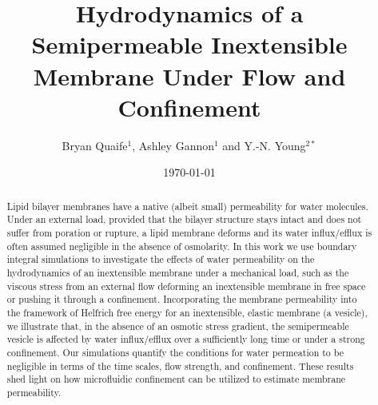 \documentclass[prb,preprint,showpacs,preprintnumbers,amsmath,amssymb,longbibliography]{revtex4-1}
\begin{document}
\title{Hydrodynamics of a Semipermeable Inextensible Membrane Under Flow
and Confinement}

\author{Bryan Quaife$^{1}$, Ashley Gannon$^{1}$ and Y.-N. Young$^{2*}$}

\date{\today}


\begin{abstract}
Lipid bilayer membranes have a native (albeit small) permeability for
water molecules. Under an external load, 
provided that the bilayer structure stays intact and does
not suffer from poration or rupture,
a lipid membrane deforms and
its water influx/efflux is often assumed negligible in the absence of
osmolarity. 
%
In this work we use boundary integral simulations to investigate the
effects of water permeability on the hydrodynamics of an inextensible membrane under
a mechanical load, such as the viscous stress from an external flow
deforming an inextensible membrane in free space or pushing it through a
confinement. Incorporating the membrane permeability into the framework of Helfrich free energy for an inextensible, elastic membrane (a vesicle), we
illustrate that, in the absence of an osmotic stress gradient, the
semipermeable vesicle is affected by water influx/efflux over a
sufficiently long time or under a strong confinement. Our simulations
quantify the conditions for water permeation to be negligible in terms
of the time scales, flow strength, and confinement. These results shed
light on how microfluidic confinement can be utilized to estimate
membrane permeability.
\end{abstract}

                              
                              
\maketitle
\end{document}
